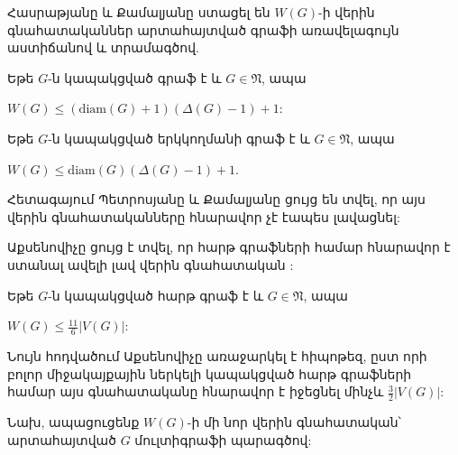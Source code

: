Հասրաթյանը և Քամալյանը \cite{AsratianKamalian1994} ստացել են $W(G)$-ի վերին գնահատականներ արտահայտված գրաֆի առավելագույն աստիճանով և տրամագծով.
\begin{theorem}
\label{t1_upper} Եթե $G$-ն կապակցված գրաֆ է և $G\in \mathfrak{N}$, ապա
\begin{center}
$W(G)\leq \left(\mathrm{diam}(G)+1\right)\left(\Delta(G) -1\right) + 1$:
\end{center}
\end{theorem}

\begin{theorem}
\label{t1_upper_bipartite} Եթե $G$-ն կապակցված երկկողմանի գրաֆ է և $G\in
\mathfrak{N}$, ապա
\begin{center}
$W(G)\leq \mathrm{diam}(G)\left(\Delta(G) -1\right) +1$.
\end{center}
\end{theorem} %

Հետագայում Պետրոսյանը և Քամալյանը \cite{KamalianPetrosyan2012} ցույց են տվել, որ այս վերին գնահատականները հնարավոր չէ էապես լավացնել: 

Աքսենովիչը ցույց է տվել, որ հարթ գրաֆների համար հնարավոր է ստանալ ավելի լավ վերին գնահատական \cite{Axenovich2002}:

\begin{theorem}
\label{t1_axenovich}
Եթե $G$-ն կապակցված հարթ գրաֆ է և $G \in \mathfrak{N}$, ապա 
\begin{center}
$W(G) \leq \frac{11}{6}|V(G)|$:
\end{center}
\end{theorem}

Նույն հոդվածում Աքսենովիչը առաջարկել է հիպոթեզ, ըստ որի բոլոր միջակայքային ներկելի կապակցված հարթ գրաֆների համար այս գնահատականը հնարավոր է իջեցնել մինչև $\frac{3}{2}|V(G)|$:

Նախ, ապացուցենք $W(G)$-ի մի նոր վերին գնահատական՝ արտահայտված $G$ մուլտիգրաֆի պարագծով:

